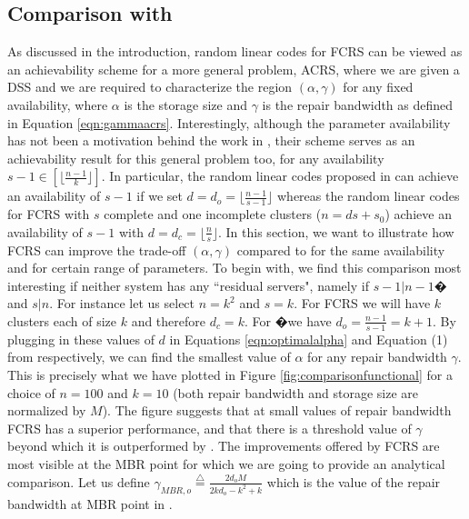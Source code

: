 \documentclass[journal,onecolumn,draftcls]{IEEEtran}
\begin{document}
\subsection{Comparison with  \cite{dimakis2010network}}
\label{sec:functionalcomparison}
As discussed in the introduction, random linear codes for FCRS can be viewed as an achievability scheme for a more general problem, ACRS, where we are given a DSS and we are required to characterize the region $(\alpha,\gamma)$ for any fixed availability, where $\alpha$ is the storage size and $\gamma$ is the repair bandwidth as defined in Equation \eqref{eqn:gammaacrs}. Interestingly, although the parameter availability has not been a motivation behind the work in \cite{dimakis2010network}, their scheme serves as an achievability result for this general problem too, for any availability $s-1 \in [\lfloor\frac{n-1}{k}\rfloor]$. In particular, the random linear codes proposed in \cite{dimakis2010network} can achieve an availability of $s-1$ if we set $d = d_o = \lfloor\frac{n-1}{s-1}\rfloor$ whereas the random linear codes for FCRS with $s$ complete and one incomplete clusters ($n = ds + s_0$) achieve an availability of $s-1$ with $d = d_c = \lfloor \frac{n}{s}\rfloor $. In this section, we want to illustrate how FCRS can improve the trade-off $(\alpha,\gamma)$ compared to \cite{dimakis2010network} for the same availability and for certain range of parameters. To begin with, we find this comparison most interesting if neither system has any ``residual servers", namely if $s-1| n-1�$ and $s| n$. For instance let us select $n = k^2$ and $s = k$. For FCRS we will have $k$ clusters each of size $k$ and therefore $d_c = k$. For \cite{dimakis2010network} �we have $d_o = \frac{n-1}{s-1} = k + 1$. By plugging in these values of $d$ in Equations \eqref{eqn:optimalalpha} and Equation (1) from \cite{dimakis2010network} respectively, we can find the smallest value of $\alpha$ for any repair bandwidth $\gamma$. This is precisely what we have plotted in Figure \ref{fig:comparisonfunctional} for a choice of $n = 100$ and $k = 10$ (both repair bandwidth and storage size are normalized by $M$). The figure suggests that at small values of repair bandwidth FCRS has a superior performance, and that there is a threshold value of $\gamma$ beyond which it is outperformed by \cite{dimakis2010network}. The improvements offered by FCRS are most visible at the MBR point for which we are going to provide an analytical comparison. Let us define $\gamma_{MBR,o}\stackrel{\triangle}{=}\frac{2d_o{M}}{2kd_o - k^2 + k} $ which is the value of the repair bandwidth at MBR point in \cite{dimakis2010network}.
\end{document}

